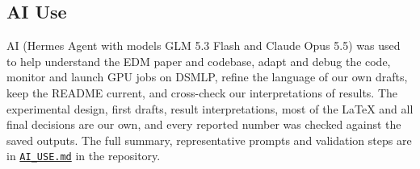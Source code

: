 \documentclass[12pt,letterpaper]{article}
\begin{document}
\makereference





\clearpage
\makeappendix

\subsection{AI Use}

AI (Hermes Agent with models GLM 5.3 Flash and Claude Opus 5.5) was used to help understand the EDM paper and codebase, adapt and debug the code, monitor and launch GPU jobs on DSMLP, refine the language of our own drafts, keep the README current, and cross-check our interpretations of results.
The experimental design, first drafts, result interpretations, most of the \LaTeX{} and all final decisions are our own, and every reported number was checked against the saved outputs.
The full summary, representative prompts and validation steps are in \href{https://github.com/vishudhshah/edm/blob/main/AI_USE.md}{\texttt{AI\_USE.md}} in the repository.
\end{document}
